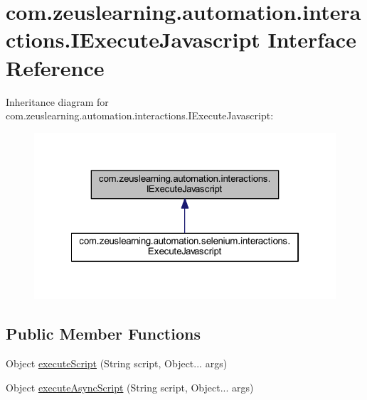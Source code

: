 \hypertarget{interfacecom_1_1zeuslearning_1_1automation_1_1interactions_1_1IExecuteJavascript}{}\section{com.\+zeuslearning.\+automation.\+interactions.\+I\+Execute\+Javascript Interface Reference}
\label{interfacecom_1_1zeuslearning_1_1automation_1_1interactions_1_1IExecuteJavascript}


Inheritance diagram for com.\+zeuslearning.\+automation.\+interactions.\+I\+Execute\+Javascript\+:\nopagebreak
\begin{figure}[H]
\begin{center}
\leavevmode
\includegraphics[width=322pt]{db/d46/interfacecom_1_1zeuslearning_1_1automation_1_1interactions_1_1IExecuteJavascript__inherit__graph}
\end{center}
\end{figure}
\subsection*{Public Member Functions}
\begin{DoxyCompactItemize}
\item 
Object \hyperlink{interfacecom_1_1zeuslearning_1_1automation_1_1interactions_1_1IExecuteJavascript_a2460e236de6afd1c685b77700474b901}{execute\+Script} (String script, Object... args)
\item 
Object \hyperlink{interfacecom_1_1zeuslearning_1_1automation_1_1interactions_1_1IExecuteJavascript_a87933d4cbc9994eb6fedfa5b2c926802}{execute\+Async\+Script} (String script, Object... args)
\end{DoxyCompactItemize}


